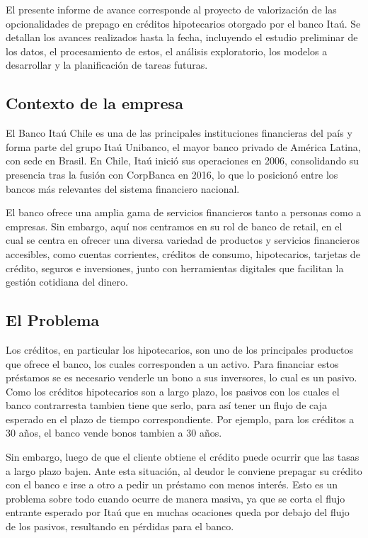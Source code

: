 \qquad El presente informe de avance corresponde al proyecto de valorización de las opcionalidades de prepago en créditos hipotecarios otorgado por el banco Itaú. Se detallan los avances realizados hasta la fecha, incluyendo el estudio preliminar de los datos, el procesamiento de estos, el análisis exploratorio, los modelos a desarrollar y la planificación de tareas futuras.

\subsection{Contexto de la empresa}

\qquad El Banco Itaú Chile es una de las principales instituciones financieras del país y forma parte del grupo Itaú Unibanco, el mayor banco privado de América Latina, con sede en Brasil. En Chile, Itaú inició sus operaciones en 2006, consolidando su presencia tras la fusión con CorpBanca en 2016, lo que lo posicionó entre los bancos más relevantes del sistema financiero nacional.

\qquad El banco ofrece una amplia gama de servicios financieros tanto a 
personas como a empresas. Sin embargo, aquí nos centramos en su rol de 
banco de retail, en el cual se centra en ofrecer una diversa variedad de 
productos y servicios financieros accesibles, como cuentas corrientes, 
créditos de consumo, hipotecarios, tarjetas de crédito, seguros e 
inversiones, junto con herramientas digitales que facilitan la gestión 
cotidiana del dinero.

\subsection{El Problema}

\qquad Los créditos, en particular los hipotecarios, son uno de los 
principales productos que ofrece el banco, los cuales corresponden a un 
activo. Para financiar estos préstamos se es necesario venderle un bono 
a sus inversores, lo cual es un pasivo. Como los créditos hipotecarios 
son a largo plazo, los pasivos con los cuales el banco contrarresta 
tambien tiene que serlo, para así tener un flujo de caja esperado en el 
plazo de tiempo correspondiente. Por ejemplo, para los créditos a 30 
años, el banco vende bonos tambien a 30 años.

\qquad Sin embargo, luego de que el cliente obtiene el crédito puede 
ocurrir que las tasas a largo plazo bajen. Ante esta situación, al 
deudor le conviene prepagar su crédito con el banco e irse a otro a 
pedir un préstamo con menos interés. Esto es un problema sobre todo 
cuando ocurre de manera masiva, ya que se corta el flujo entrante 
esperado por Itaú que en muchas ocaciones queda por debajo del flujo de 
los pasivos, resultando en pérdidas para el banco.

